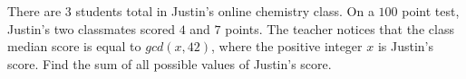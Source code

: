 There are $3$ students total in Justin's online chemistry class. On a $100$ point test, Justin's two classmates scored $4$ and $7$ points. The teacher notices that the class median score is equal to $gcd(x, 42)$,  where the positive integer $x$ is Justin's score. Find the sum of all possible values of Justin's score.
